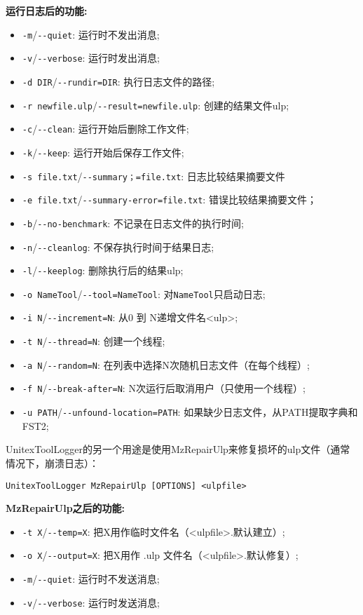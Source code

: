 \bigskip
\noindent \textbf{运行日志后的功能:}
\begin{itemize}
  \item \verb+-m+/\verb+--quiet+: 运行时不发出消息;
  \item \verb+-v+/\verb+--verbose+: 运行时发出消息;
  
  \item \verb+-d DIR+/\verb+--rundir=DIR+: 执行日志文件的路径;
  \item \verb+-r newfile.ulp+/\verb+--result=newfile.ulp+: 创建的结果文件ulp;

  \item \verb+-c+/\verb+--clean+: 运行开始后删除工作文件;
  \item \verb+-k+/\verb+--keep+: 运行开始后保存工作文件;

  \item \verb+-s file.txt+/\verb+--summary；=file.txt+: 日志比较结果摘要文件
  \item \verb+-e file.txt+/\verb+--summary-error=file.txt+: 错误比较结果摘要文件；

  \item \verb+-b+/\verb+--no-benchmark+: 不记录在日志文件的执行时间;

  \item \verb+-n+/\verb+--cleanlog+: 不保存执行时间于结果日志;
  \item \verb+-l+/\verb+--keeplog+: 删除执行后的结果ulp;

  \item \verb+-o NameTool+/\verb+--tool=NameTool+:  对\verb+NameTool+只启动日志;
  \item \verb+-i N+/\verb+--increment=N+:  从0 到 N递增文件名<ulp>;
  \item \verb+-t N+/\verb+--thread=N+: 创建一个线程;
  \item \verb+-a N+/\verb+--random=N+: 在列表中选择N次随机日志文件（在每个线程）;
  \item \verb+-f N+/\verb+--break-after=N+: N次运行后取消用户（只使用一个线程）;

  \item \verb+-u PATH+/\verb+--unfound-location=PATH+: 如果缺少日志文件，从PATH提取字典和FST2;
\end{itemize}


UnitexToolLogger的另一个用途是使用MzRepairUlp来修复损坏的ulp文件（通常情况下，崩溃日志）：

\bigskip
\verb+UnitexToolLogger MzRepairUlp [OPTIONS] <ulpfile>+

\bigskip
\noindent \textbf{MzRepairUlp之后的功能:}
\begin{itemize}
\item \verb+-t X+/\verb+--temp=X+: 把X用作临时文件名（<ulpfile>.默认建立）;
\item \verb+-o X+/\verb+--output=X+: 把X用作 .ulp 文件名（<ulpfile>.默认修复）;
  \item \verb+-m+/\verb+--quiet+: 运行时不发送消息;
  \item \verb+-v+/\verb+--verbose+: 运行时发送消息;
\end{itemize}


